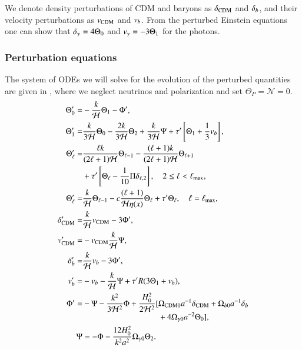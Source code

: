 We denote density perturbations of CDM and baryons as $\delta_\mathrm{CDM}$ and $\delta_b$, and their velocity perturbations as $v_\mathrm{CDM}$ and $v_b$. From the perturbed Einstein equations one can show that $\delta_\gamma=4\Theta_0$ and $v_\gamma=-3\Theta_1$ for the photons. 

\subsubsection{Perturbation equations} \label{sssec:M3:theory:perturbation_equations}
The system of ODEs we will solve for the evolution of the perturbed quantities are given in \cite[Eq. (22)]{callin}, where we neglect neutrinos and polarization and set $\Theta_P=\mathcal{N}=0$.   
\begin{subequations} \label{eq:M3:theory:perturbation_ODEs}
    \begin{align}
        \Theta_0' =& - \frac{k}{\mathcal{H}}\Theta_1 - \Phi', \label{eq:M3:theory:perturbation_ODEs_Theta0}\\
        \Theta_1' =& \frac{k}{3\mathcal{H}}\Theta_0 - \frac{2k}{3\mathcal{H}}\Theta_2 + \frac{k}{3\mathcal{H}}\Psi + \tau' \left[ \Theta_1 + \frac{1}{3}v_b \right], \label{eq:M3:theory:perturbation_ODEs_Theta1} \\ 
        \Theta_\ell' =& \frac{\ell k}{(2\ell+1)\mathcal{H}}\Theta_{\ell-1} - \frac{(\ell+1)k}{(2\ell+1)\mathcal{H}}\Theta_{\ell+1} \nonumber \\
        & + \tau'\left[ \Theta_\ell - \frac{1}{10}\Pi \delta_{\ell,2} \right],\quad 2\leq\ell<\ell_\mathrm{max}, \label{eq:M3:theory:perturbation_ODEs_Theta_ell} \\
        \Theta_\ell' =& \frac{k}{\mathcal{H}}\Theta_{\ell-1} - c \frac{(\ell+1)}{\mathcal{H}\eta(x)}\Theta_{\ell} + \tau' \Theta_\ell,\quad \ell=\ell_\mathrm{max}, \label{eq:M3:theory:perturbation_ODEs_Theta_ell_max} \\
        \delta_\mathrm{CDM}' =& \frac{k}{\mathcal{H}} v_\mathrm{CDM} - 3\Phi', \label{eq:M3:theory:perturbation_ODEs_delta_cdm} \\
        v_\mathrm{CDM}' =& - v_\mathrm{CDM} \frac{k}{\mathcal{H}} \Psi, \label{eq:M3:theory:perturbation_ODEs_v_cdm} \\
        \delta_b' =& \frac{k}{\mathcal{H}} v_b - 3\Phi', \label{eq:M3:theory:perturbation_ODEs_delta_b} \\
        v_b' =& -v_b - \frac{k}{\mathcal{H}} \Psi + \tau' R(3\Theta_1 + v_b), \label{eq:M3:theory:perturbation_ODEs_v_b} \\
        \Phi' =& -\Psi - \frac{k^2}{3\mathcal{H}^2}\Phi + \frac{H_0^2}{2\mathcal{H}^2} \begin{aligned}[t]
            [&\Omega_\mathrm{CDM0} a^{-1}\delta_\mathrm{CDM} + \Omega_{b0} a^{-1} \delta_b \\
            &+4\Omega_{\gamma 0} a^{-2} \Theta_0], 
            \end{aligned} \label{eq:M3:theory:perturbation_ODEs_Phi} \\
        \Psi &= -\Phi - \frac{12H_0^2}{k^2 a^2} \Omega_{\gamma 0} \Theta_2. \label{eq:M3:theory:perturbation_ODEs_Psi}
    \end{align}
\end{subequations}
